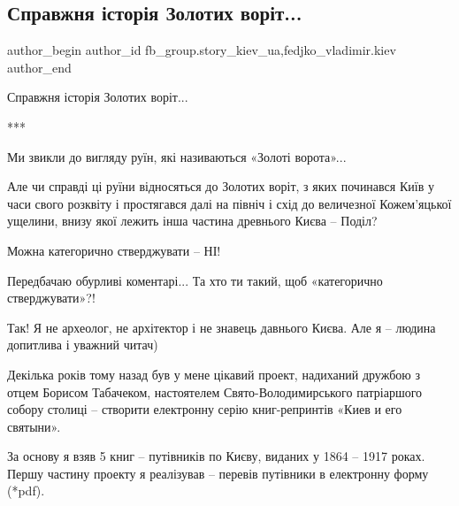  
 
 
 
 
 
\subsection{Справжня історія Золотих воріт...}
\label{sec:28_12_2021.fb.fb_group.story_kiev_ua.2.zolotye_vorota}
 
\ifcmt
 author_begin
   author_id fb_group.story_kiev_ua,fedjko_vladimir.kiev
 author_end
\fi

Справжня історія Золотих воріт...

***

Ми звикли до вигляду руїн, які називаються «Золоті ворота»... 

Але чи справді ці руїни відносяться до Золотих воріт, з яких починався Київ у
часи свого розквіту і простягався далі на північ і схід до величезної
Кожем’яцької ущелини, внизу якої лежить інша частина древнього Києва – Поділ?


Можна категорично стверджувати – НІ!

Передбачаю обурливі коментарі... Та хто ти такий, щоб «категорично
стверджувати»?!

Так! Я не археолог, не архітектор і не знавець давнього Києва. Але я – людина
допитлива і уважний читач)


Декілька років тому назад був у мене цікавий проект, надиханий дружбою з отцем
Борисом Табачеком, настоятелем Свято-Володимирського патріаршого собору столиці
– створити електронну серію книг-репринтів «Киев и его святыни». 


За основу я взяв 5 книг – путівників по Києву, виданих у 1864 – 1917 роках.
Першу частину проекту я реалізував – перевів путівники в електронну форму
(*pdf). 

